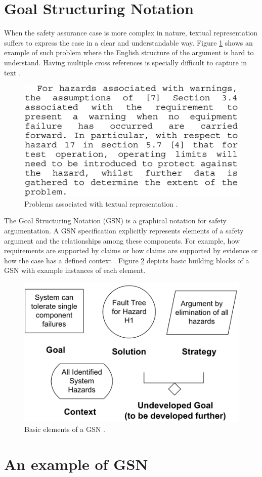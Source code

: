 \section{Goal Structuring Notation}
When the safety assurance case is more complex in nature, textual representation suffers to express the case in a clear and understandable way. Figure \ref{fig:text-case} shows an example of such problem where the English structure of the argument is hard to understand. Having multiple cross references is specially difficult to capture in text \cite{gsn2004Kelly}.
\begin{figure}
    \includegraphics[width=0.5\linewidth ]{figures/textual_case.png}
    \centering
    \caption{Problems associated with textual representation \cite{gsn2004Kelly}.}
    \label{fig:text-case}
\end{figure}

The Goal Structuring Notation (GSN) is a graphical notation for safety argumentation. A GSN specification explicitly represents elements of a safety argument and the relationships among these components. For example, how requirements are supported by claims or how claims are supported by evidence or how the case has a defined context \cite{gsn2004Kelly}. Figure \ref{fig:gsn} depicts basic building blocks of a GSN with example instances of each element. 

\begin{figure}
    \includegraphics[width=0.5\linewidth ]{figures/gsn.png}
    \centering
    \caption{Basic elements of a GSN \cite{gsn2004Kelly}.}
    \label{fig:gsn}
\end{figure}

\section{An example of GSN}

